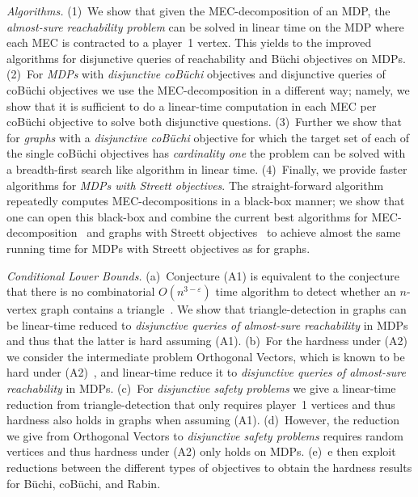 \documentclass[11pt,letterpaper]{article}
\newif\iffullversion
\newcommand{\infull}[1]{\iffullversion #1\fi}
\newcommand{\inshort}[1]{\iffullversion \else #1\fi}
\begin{document}
\smallskip{}

\emph{Algorithms.}
	(1)~We show that given the MEC-decomposition of an MDP, the \emph{almost-sure reachability problem}
	can be solved in linear time on the MDP where each MEC is contracted to 
	a player~1 vertex. This yields to the improved algorithms 
	for disjunctive queries of reachability and Büchi objectives on MDPs.
(2)~For \emph{MDPs} with \emph{disjunctive coBüchi} objectives and disjunctive queries of 
	coBüchi objectives we use the MEC-decomposition in a different way;
	namely, we show that it is sufficient to do a linear-time computation in
	each MEC per coBüchi objective to solve both disjunctive questions.
(3)~Further we show that for \emph{graphs} with a 
	\emph{disjunctive coBüchi} objective for which the target set of each of the
	single coBüchi objectives has \emph{cardinality one}
	the problem can be solved with a breadth-first search like algorithm in linear time.
(4)~Finally, we provide faster algorithms for \emph{MDPs with Streett objectives}.
	The straight-forward algorithm repeatedly
	computes MEC-decompositions in a black-box manner; we show that one can 
	open this black-box and combine the current
	best algorithms for MEC-decomposition~\cite{ChatterjeeH14} and graphs with 
	Streett objectives~\cite{HenzingerT96,ChatterjeeHL15}
	to achieve almost the same running time for MDPs with Streett objectives
	as for graphs.

\emph{Conditional Lower Bounds.}
(a)~Conjecture (A1)
is equivalent to the conjecture that there is no combinatorial $O(n^{3-\varepsilon})$
time algorithm to detect whether an $n$-vertex graph contains a triangle~\cite{WilliamsW10}.
	We show that triangle-detection in graphs can be linear-time reduced 
	to \emph{disjunctive queries of almost-sure reachability} in MDPs and thus 
	that the latter is hard assuming (A1).
(b)~For the hardness under (A2) we consider the intermediate problem 
	Orthogonal Vectors, which is known to be hard under (A2)~\cite{Williams05},
	and linear-time reduce it to \emph{disjunctive queries of almost-sure 
	reachability} in MDPs.
(c)~For \emph{disjunctive safety problems} we give a linear-time reduction from  
	triangle-detection that only requires player~1 vertices and thus
	hardness also holds in graphs when assuming (A1).
(d)~However, the reduction we give from Orthogonal Vectors
	to \emph{disjunctive safety problems} requires random vertices and thus hardness
	under (A2) only holds on MDPs.
(e)~\infull{Based on the hardness results for {almost-sure reachability} and
	safety, w}e then exploit reductions between the different types of
	objectives to obtain the hardness results for Büchi, coBüchi,
	and Rabin.
\end{document}
